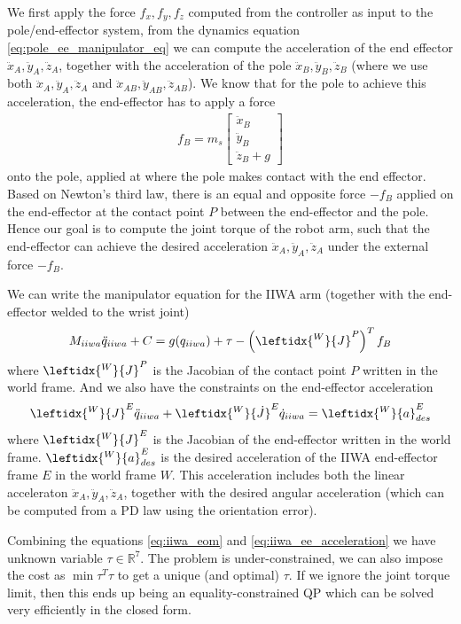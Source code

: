 \documentclass{article}
\begin{document}
We first apply the force $f_x, f_y, f_z$ computed from the controller as input to the pole/end-effector system, from the dynamics equation \eqref{eq:pole_ee_manipulator_eq} we can compute the acceleration of the end effector $\ddot{x}_A, \ddot{y}_A, \ddot{z}_A$, together with the acceleration of the pole $\ddot{x}_B, \ddot{y}_B, \ddot{z}_B$ (where we use both $\ddot{x}_A, \ddot{y}_A, \ddot{z}_A$ and $\ddot{x}_{AB}, \ddot{y}_{AB}, \ddot{z}_{AB}$). We know that for the pole to achieve this acceleration, the end-effector has to apply a force
\begin{align}
	f_B = m_s\begin{bmatrix}\ddot{x}_B \\ \ddot{y}_B \\ \ddot{z}_B + g\end{bmatrix}
\end{align}
onto the pole, applied at where the pole makes contact with the end effector. Based on Newton's third law, there is an equal and opposite force $-f_B$ applied on the end-effector at the contact point $P$ between the end-effector and the pole. Hence our goal is to compute the joint torque of the robot arm, such that the end-effector can achieve the desired acceleration $\ddot{x}_A, \ddot{y}_A, \ddot{z}_A$ under the external force $-f_B$.

We can write the manipulator equation for the IIWA arm (together with the end-effector welded to the wrist joint)
\begin{align}
	M_{iiwa}\ddot{q}_{iiwa} + C = g(q_{iiwa}) + \tau - \left(\leftidx{^W}{J}^P\right)^Tf_B\label{eq:iiwa_eom}
\end{align}
where $\leftidx{^W}{J}^P$ is the Jacobian of the contact point $P$ written in the world frame.
And we also have the constraints on the end-effector acceleration
\begin{align}
	\leftidx{^W}{J}^E\ddot{q}_{iiwa} + \leftidx{^W}{\dot{J}}^E\dot{q}_{iiwa} = \leftidx{^W}{a}^E_{des}\label{eq:iiwa_ee_acceleration}
\end{align}
where $\leftidx{^W}{J}^E$ is the Jacobian of the end-effector written in the world frame. $\leftidx{^W}{a}^E_{des}$ is the desired acceleration of the IIWA end-effector frame $E$ in the world frame $W$. This acceleration includes both the linear acceleraton $\ddot{x}_A, \ddot{y}_A, \ddot{z}_A$, together with the desired angular acceleration (which can be computed from a PD law using the orientation error).

Combining the equations \eqref{eq:iiwa_eom} and \eqref{eq:iiwa_ee_acceleration} we have unknown variable $\tau\in\mathbb{R}^7$. The problem is under-constrained, we can also impose the cost as $\min \tau^T\tau$ to get a unique (and optimal) $\tau$. If we ignore the joint torque limit, then this ends up being an equality-constrained QP which can be solved very efficiently in the closed form.
\end{document}
